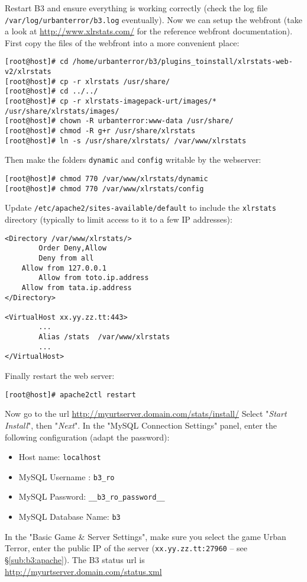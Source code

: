 \noindent 
Restart B3 and ensure everything is working correctly (check the log file \\
\texttt{/var/log/urbanterror/b3.log} eventually). 
Now we can setup the webfront (take a look at \url{http://www.xlrstats.com/} for
the reference webfront documentation). 
First copy the files of the webfront into a more convenient place:
\begin{lstlisting}[style=command]
[root@host]# cd /home/urbanterror/b3/plugins_toinstall/xlrstats-web-v2/xlrstats
[root@host]# cp -r xlrstats /usr/share/
[root@host]# cd ../../
[root@host]# cp -r xlrstats-imagepack-urt/images/* /usr/share/xlrstats/images/
[root@host]# chown -R urbanterror:www-data /usr/share/
[root@host]# chmod -R g+r /usr/share/xlrstats
[root@host]# ln -s /usr/share/xlrstats/ /var/www/xlrstats
\end{lstlisting}

\noindent 
Then make the folders \texttt{dynamic} and \texttt{config} writable by the
webserver:
\begin{lstlisting}[style=command]
[root@host]# chmod 770 /var/www/xlrstats/dynamic
[root@host]# chmod 770 /var/www/xlrstats/config
\end{lstlisting}

\noindent 
Update \texttt{/etc/apache2/sites-available/default} to include
the \texttt{xlrstats} directory (typically to limit access to it to a few IP addresses):
\begin{lstlisting}[style=apachecfg]
<Directory /var/www/xlrstats/>
        Order Deny,Allow
        Deny from all
	Allow from 127.0.0.1
        Allow from toto.ip.address
	Allow from tata.ip.address	
</Directory>

<VirtualHost xx.yy.zz.tt:443>
        ...
        Alias /stats  /var/www/xlrstats
        ...
</VirtualHost>

\end{lstlisting}
Finally restart the web server: 
\begin{lstlisting}[style=command]
[root@host]# apache2ctl restart
\end{lstlisting}

\noindent 
Now go to the url \url{http://myurtserver.domain.com/stats/install/}
Select "\emph{Start Install}", then "\emph{Next}". 
In the "MySQL Connection Settings" panel, enter the following configuration (adapt the password): 
\begin{itemize}\setitemsep
\item Host name: \texttt{localhost}
\item MySQL Username : \texttt{b3\_ro}
\item MySQL Password: \texttt{\_\_b3\_ro\_password\_\_}
\item MySQL Database Name: \texttt{b3}
\end{itemize}
In the "Basic Game \& Server Settings", make sure you select the game Urban
Terror, enter the public IP of the server (\texttt{xx.yy.zz.tt:27960} -- see
\S\ref{sub:b3:apache}).  The B3 status url is
\url{http://myurtserver.domain.com/status.xml}

